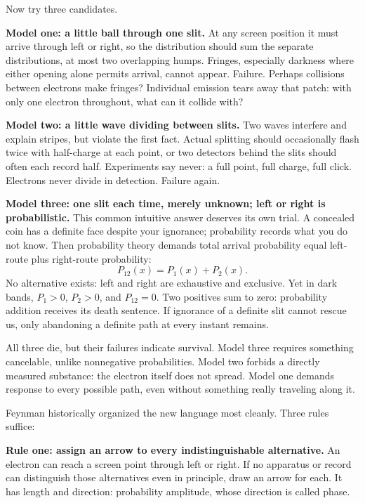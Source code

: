 Now try three candidates.

\textbf{Model one: a little ball through one slit.} At any screen position it must arrive through left or right, so the distribution should sum the separate distributions, at most two overlapping humps. Fringes, especially darkness where either opening alone permits arrival, cannot appear. Failure. Perhaps collisions between electrons make fringes? Individual emission tears away that patch: with only one electron throughout, what can it collide with?

\textbf{Model two: a little wave dividing between slits.} Two waves interfere and explain stripes, but violate the first fact. Actual splitting should occasionally flash twice with half-charge at each point, or two detectors behind the slits should often each record half. Experiments say never: a full point, full charge, full click. Electrons never divide in detection. Failure again.

\textbf{Model three: one slit each time, merely unknown; left or right is probabilistic.} This common intuitive answer deserves its own trial. A concealed coin has a definite face despite your ignorance; probability records what you do not know. Then probability theory demands total arrival probability equal left-route plus right-route probability:
\[
P_{12}(x) = P_1(x) + P_2(x).
\]
No alternative exists: left and right are exhaustive and exclusive. Yet in dark bands, \(P_1 > 0\), \(P_2 > 0\), and \(P_{12} = 0\). Two positives sum to zero: probability addition receives its death sentence. If ignorance of a definite slit cannot rescue us, only abandoning a definite path at every instant remains.

All three die, but their failures indicate survival. Model three requires something cancelable, unlike nonnegative probabilities. Model two forbids a directly measured substance: the electron itself does not spread. Model one demands response to every possible path, even without something really traveling along it.


Feynman historically organized the new language most cleanly. Three rules suffice:

\textbf{Rule one: assign an arrow to every indistinguishable alternative.} An electron can reach a screen point through left or right. If no apparatus or record can distinguish those alternatives even in principle, draw an arrow for each. It has length and direction: probability amplitude, whose direction is called phase.

